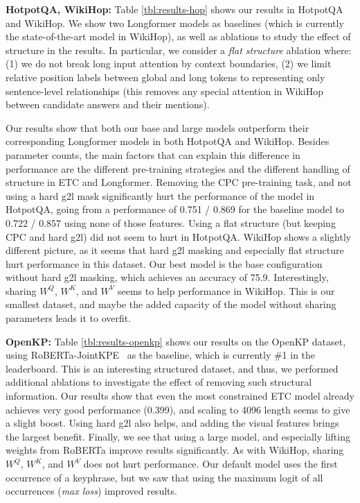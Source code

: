 \documentclass[11pt,a4paper]{article}
\begin{document}
{\bf HotpotQA, WikiHop:} Table \ref{tbl:results-hop} shows our results in HotpotQA and WikiHop. We show two Longformer models as baselines (which is currently the state-of-the-art model in WikiHop), as well as ablations to study the effect of structure in the results. In particular, we consider a {\em flat structure} ablation where: (1) we do not break long input attention by context boundaries, (2) we limit relative position labels between global and long tokens to representing only sentence-level relationships (this removes any special attention in WikiHop between candidate answers and their mentions).

Our results show that both our base and large models outperform their corresponding Longformer models in both HotpotQA and WikiHop. Besides parameter counts, the main factors that can explain this difference in performance are the different pre-training strategies and the different handling of structure in ETC and Longformer.
Removing the CPC pre-training task, and not using a hard g2l mask significantly hurt the performance of the model in HotpotQA, going from a performance of 0.751 / 0.869 for the baseline model to 0.722 / 0.857 using none of those features. Using a flat structure (but keeping CPC and hard g2l) did not seem to hurt in HotpotQA.
WikiHop shows a slightly different picture, as it seems that hard g2l masking and especially flat structure hurt performance in this dataset. Our best model is the base configuration without hard g2l masking, which achieves an accuracy of 75.9. Interestingly, sharing $W^Q$, $W^K$, and $W^V$ seems to help performance in WikiHop. This is our smallest dataset, and maybe the added capacity of the model without sharing parameters leads it to overfit.

{\bf OpenKP:} Table \ref{tbl:results-openkp} shows our results on the OpenKP dataset, using RoBERTa-JointKPE~\cite{sun2020joint} as the baseline, which is currently \#1 in the leaderboard. This is an interesting structured dataset, and thus, we performed additional ablations to investigate the effect of removing such structural information. Our results show that even the most constrained ETC model already achieves very good performance (0.399), and scaling to 4096 length seems to give a slight boost. Using hard g2l also helps, and adding the visual features brings the largest benefit. Finally, we see that using a large model, and especially lifting weights from RoBERTa improve results significantly. As with WikiHop, sharing $W^Q$, $W^K$, and $W^V$ does not hurt performance. Our default model uses the first occurrence of a keyphrase, but we saw that using the maximum logit of all occurrences ({\em max loss}) improved results.
\end{document}
